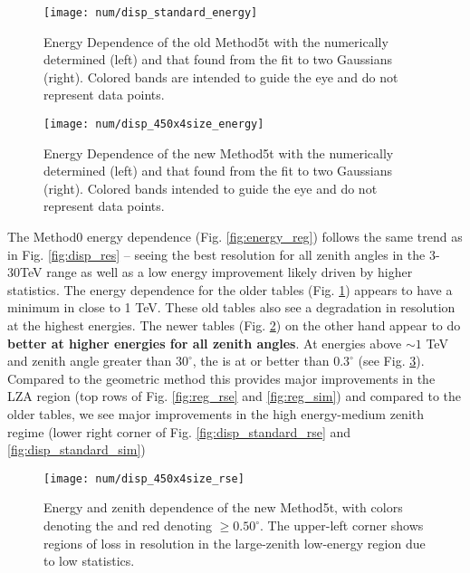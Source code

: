 \documentclass[main.tex]{subfiles}
\begin{document}
\begin{figure}[htbp]
  \centering
  \texttt{[image: num/disp\_standard\_energy]}
  \caption[Energy Dependence of the old Method5t.]{Energy Dependence of the old Method5t with the numerically determined \rse (left) and that found from the fit to two Gaussians (right). Colored bands are intended to guide the eye and do not represent data points.}
  \label{fig:energy_disp_standard}    
\end{figure}

\begin{figure}[htbp]
  \centering
  \texttt{[image: num/disp\_450x4size\_energy]}
  \caption[Energy Dependence of the new Method5t.]{Energy Dependence of the new Method5t with the numerically determined \rse (left) and that found from the fit to two Gaussians (right). Colored bands intended to guide the eye and do not represent data points.}
  \label{fig:energy_disp_450}    
\end{figure}

The Method0 energy dependence (Fig. \ref{fig:energy_reg}) follows the same trend as in Fig. \ref{fig:disp_res} -- seeing the best resolution for all zenith angles in the 3-30TeV range as well as a low energy improvement likely driven by higher statistics. The energy dependence for the older \disp tables (Fig. \ref{fig:energy_disp_standard}) appears to have a minimum in \rse close to 1 TeV. These old \disp tables also see a degradation in resolution at the highest energies. The newer \disp tables (Fig. \ref{fig:energy_disp_450}) on the other hand appear to do {\bf better at higher energies for all zenith angles}. At energies above $\sim 1$ TeV and zenith angle greater than $30^\circ$, the \rse is at or better than $0.3^\circ$ (see Fig. \ref{fig:energy_new_contour}). Compared to the geometric method this provides major improvements in the LZA region (top rows of Fig. \ref{fig:reg_rse} and \ref{fig:reg_sim}) and compared to the older \disp tables, we see major improvements in the high energy-medium zenith regime (lower right corner of Fig. \ref{fig:disp_standard_rse} and \ref{fig:disp_standard_sim})

\begin{figure}[htbp]
  \centering
  \texttt{[image: num/disp\_450x4size\_rse]}
  \caption[Energy and zenith dependence of the new Method5t.]{Energy and zenith dependence of the new Method5t, with colors denoting the \rse and red denoting \rse$\geq0.50^\circ$. The upper-left corner shows regions of loss in resolution in the large-zenith low-energy region due to low statistics.}
  \label{fig:energy_new_contour}
\end{figure}
\end{document}
